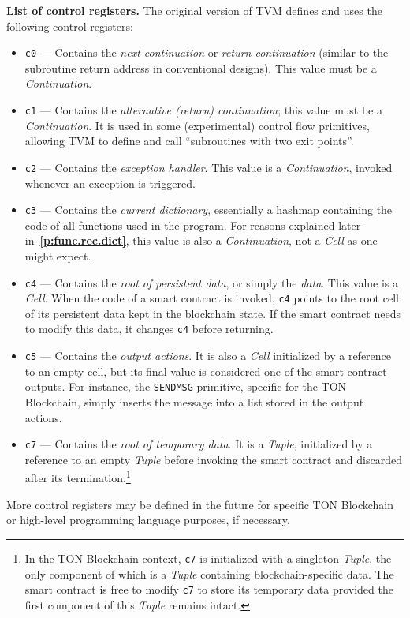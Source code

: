 \documentclass[12pt,oneside]{article}
\def\makepoint#1{\medbreak\noindent{\bf #1.\ }}
\def\nxsubpoint{\refstepcounter{subsubsection}%
    \smallbreak\makepoint{\thesubsubsection}}
\def\refpoint#1{{\rm\textbf{\ref{#1}}}}
\let\ptref=\refpoint
\def\emb#1{\textbf{#1.}}
\begin{document}
    \nxsubpoint\label{sp:cr.list}\emb{List of control registers}
    The original version of TVM defines and uses the following control registers:
    \begin{itemize}
        \item \texttt{c0} --- Contains the {\em next continuation} or {\em return continuation} (similar to the subroutine return address in conventional designs). This value must be a {\em Continuation}.
        \item \texttt{c1} --- Contains the {\em alternative (return) continuation}; this value must be a {\em Continuation}. It is used in some (experimental) control flow primitives, allowing TVM to define and call ``subroutines with two exit points''.
        \item \texttt{c2} --- Contains the {\em exception handler}. This value is a {\em Continuation}, invoked whenever an exception is triggered.
        \item \texttt{c3} --- Contains the {\em current dictionary}, essentially a hashmap containing the code of all functions used in the program. For reasons explained later in~\ptref{p:func.rec.dict}, this value is also a {\em Continuation}, not a {\em Cell\/} as one might expect.
        \item \texttt{c4} --- Contains the {\em root of persistent data}, or simply the {\em data}. This value is a {\em Cell}. When the code of a smart contract is invoked, \texttt{c4} points to the root cell of its persistent data kept in the blockchain state. If the smart contract needs to modify this data, it changes \texttt{c4} before returning.
        \item \texttt{c5} --- Contains the {\em output actions}. It is also a {\em Cell\/} initialized by a reference to an empty cell, but its final value is considered one of the smart contract outputs. For instance, the {\tt SENDMSG} primitive, specific for the TON Blockchain, simply inserts the message into a list stored in the output actions.
        \item \texttt{c7} --- Contains the {\em root of temporary data}. It is a {\em Tuple}, initialized by a reference to an empty {\em Tuple\/} before invoking the smart contract and discarded after its termination.\footnote{In the TON Blockchain context, \texttt{c7} is initialized with a singleton {\em Tuple}, the only component of which is a {\em Tuple\/} containing blockchain-specific data. The smart contract is free to modify \texttt{c7} to store its temporary data provided the first component of this {\em Tuple\/} remains intact.}
    \end{itemize}
    More control registers may be defined in the future for specific TON Block\-chain or high-level programming language purposes, if necessary.
\end{document}
